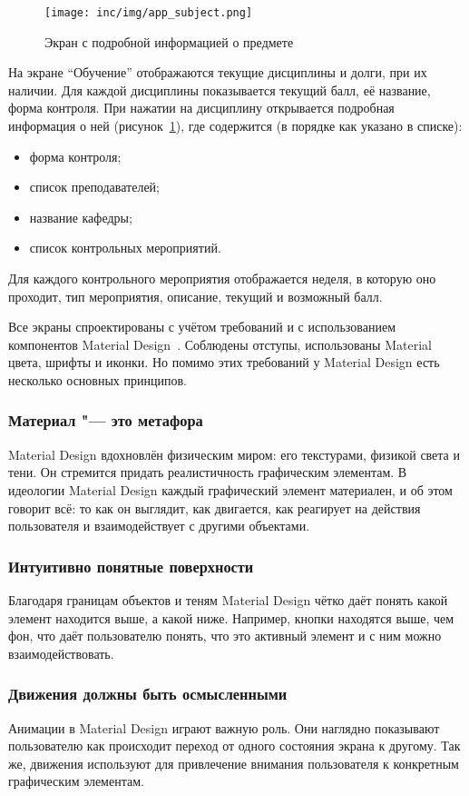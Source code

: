 \begin{figure}[ht]
  \centering
  \texttt{[image: inc/img/app\_subject.png]}
  \caption{Экран с подробной информацией о предмете}
  \label{fig:appSubject}
\end{figure}

На экране ``Обучение'' отображаются текущие дисциплины и долги, при их наличии.
Для каждой дисциплины показывается текущий балл, её название, форма контроля.
При нажатии на дисциплину открывается подробная информация о ней (рисунок~\ref{fig:appSubject}), где содержится (в порядке как указано в списке):
\begin{itemize}
  \item форма контроля;
  \item список преподавателей;
  \item название кафедры;
  \item список контрольных мероприятий.
\end{itemize}

Для каждого контрольного мероприятия отображается неделя, в которую оно проходит, тип мероприятия, описание, текущий и возможный балл.

Все экраны спроектированы с учётом требований и с использованием компонентов Material Design~\cite{md}.
Соблюдены отступы, использованы Material цвета, шрифты и иконки.
Но помимо этих требований у Material Design есть несколько основных принципов.

\subsubsection*{Материал "--- это метафора}
Material Design вдохновлён физическим миром: его текстурами, физикой света и тени.
Он стремится придать реалистичность графическим элементам.
В идеологии Material Design каждый графический элемент материален, и об этом говорит всё: то как он выглядит, как двигается, как реагирует на действия пользователя и взаимодействует с другими объектами.

\subsubsection*{Интуитивно понятные поверхности}
Благодаря границам объектов и теням Material Design чётко даёт понять какой элемент находится выше, а какой ниже.
Например, кнопки находятся выше, чем фон, что даёт пользователю понять, что это активный элемент и с ним можно взаимодействовать.

\subsubsection*{Движения должны быть осмысленными}
Анимации в Material Design играют важную роль.
Они наглядно показывают пользователю как происходит переход от одного состояния экрана к другому.
Так же, движения используют для привлечение внимания пользователя к конкретным графическим элементам.

